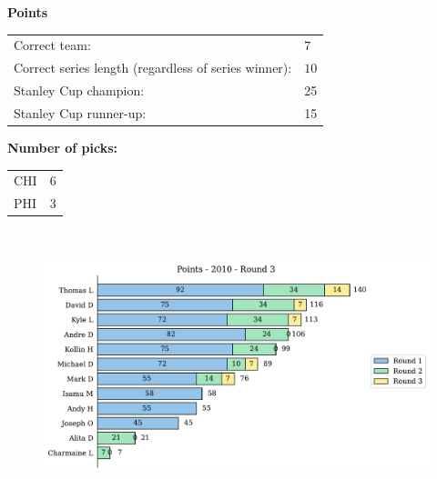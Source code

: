 \documentclass[10pt]{article}
\begin{document}
{\bf Points}\\
\begin{minipage}[t]{12cm}
    \vspace{0pt}
    \begin{tabular}{l l}
        Correct team:	& $7$\\
        Correct series length (regardless of series winner):	& $10$\\
        Stanley Cup champion:	& 25\\
        Stanley Cup runner-up:	& 15\\
    \end{tabular}

    \vspace{0.5cm}
    {\bf Number of picks:}\\
    \begin{tabular}{lc }
        CHI & 6 \\
        PHI & 3 \\
    \end{tabular}
\end{minipage}
%
\begin{minipage}[t]{13cm}
    \vspace{0pt}
    \begin{figure}[H]
        \vspace{-1cm}
        \includegraphics[width=12cm,height=8cm,keepaspectratio]{../../figures/2010/Points-2010-Round3.pdf}
    \end{figure}
\end{minipage}
\end{document}
